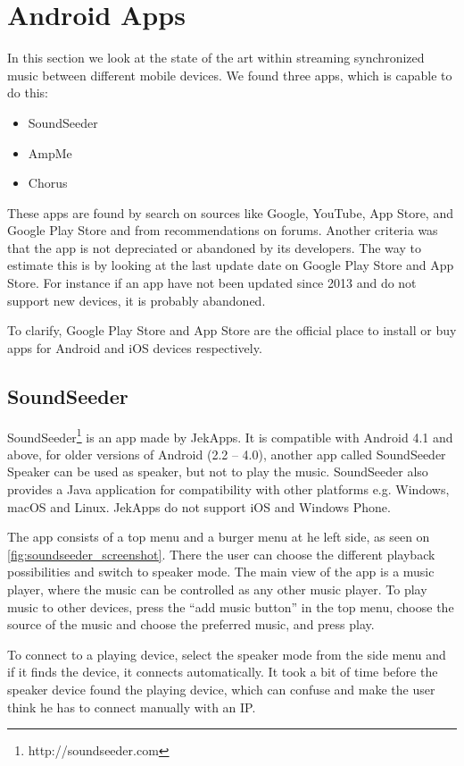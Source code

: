 \section{Android Apps}\label{sec:sota_apps}
In this section we look at the state of the art within streaming synchronized music between different mobile devices.
We found three apps, which is capable to do this:
\begin{itemize}
    \item SoundSeeder
    \item AmpMe
    \item Chorus
\end{itemize}

These apps are found by search on sources like Google, YouTube, App Store, and Google Play Store and from recommendations on forums. 
Another criteria was that the app is not depreciated or abandoned by its developers.
The way to estimate this is by looking at the last update date on Google Play Store and App Store.
For instance if an app have not been updated since 2013 and do not support new devices, it is probably abandoned.

To clarify, Google Play Store and App Store are the official place to install or buy apps for Android and iOS devices respectively.

\subsection{SoundSeeder}
SoundSeeder\footnote{http://soundseeder.com} is an app made by JekApps. 
It is compatible with Android 4.1 and above, for older versions of Android (2.2 -- 4.0),
another app called SoundSeeder Speaker can be used as speaker, but not to play the music.
SoundSeeder also provides a Java application for compatibility with other platforms e.g. Windows, macOS and Linux.
JekApps do not support iOS and Windows Phone\cite{soundseeder_ios}.

The app consists of a top menu and a burger menu at he left side, as seen on \cref{fig:soundseeder_screenshot}.
There the user can choose the different playback possibilities and switch to speaker mode.
The main view of the app is a music player, where the music can be controlled as any other music player. 
To play music to other devices, press the ``add music button'' in the top menu, choose the source of the music and choose the preferred music, and press play. 

To connect to a playing device, select the speaker mode from the side menu and if it finds the device, it connects automatically.
It took a bit of time before the speaker device found the playing device, which can confuse and make the user think he has to connect manually with an IP. 

